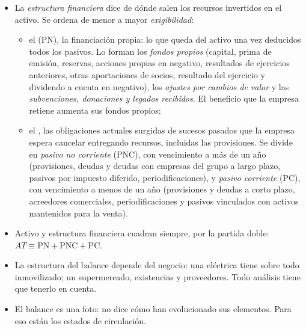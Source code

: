 \documentclass[11pt]{article}
\begin{document}
\begin{itemize}
\begin{itemize}
  \item el \emph{activo corriente} (AC) materializa el ciclo de explotación y no suele exceder el año: los activos no corrientes mantenidos para la venta, las existencias, los deudores comerciales, las inversiones financieras a corto plazo, las periodificaciones y el efectivo y otros activos líquidos equivalentes (caja, depósitos a la vista e inversiones convertibles en efectivo con vencimiento no superior a 3~meses desde su adquisición).
  \end{itemize}
\item La \emph{estructura financiera} dice de dónde salen los recursos invertidos en el activo. Se ordena de menor a mayor \emph{exigibilidad}:
  \begin{itemize}
  \item el  (PN), la financiación propia: lo que queda del activo una vez deducidos todos los pasivos. Lo forman los \emph{fondos propios} (capital, prima de emisión, reservas, acciones propias en negativo, resultados de ejercicios anteriores, otras aportaciones de socios, resultado del ejercicio y dividendo a cuenta en negativo), los \emph{ajustes por cambios de valor} y las \emph{subvenciones, donaciones y legados recibidos}. El beneficio que la empresa retiene aumenta sus fondos propios;
  \item el , las obligaciones actuales surgidas de sucesos pasados que la empresa espera cancelar entregando recursos, incluidas las provisiones. Se divide en \emph{pasivo no corriente} (PNC), con vencimiento a más de un año (provisiones, deudas y deudas con empresas del grupo a largo plazo, pasivos por impuesto diferido, periodificaciones), y \emph{pasivo corriente} (PC), con vencimiento a menos de un año (provisiones y deudas a corto plazo, acreedores comerciales, periodificaciones y pasivos vinculados con activos mantenidos para la venta).
  \end{itemize}
\item Activo y estructura financiera cuadran siempre, por la partida doble: $AT\equiv\mathrm{PN}+\mathrm{PNC}+\mathrm{PC}$.
\item La estructura del balance depende del negocio: una eléctrica tiene sobre todo inmovilizado; un supermercado, existencias y proveedores. Todo análisis tiene que tenerlo en cuenta.
\item El balance es una foto: no dice cómo han evolucionado sus elementos. Para eso están los estados de circulación.
\end{itemize}
\end{document}
